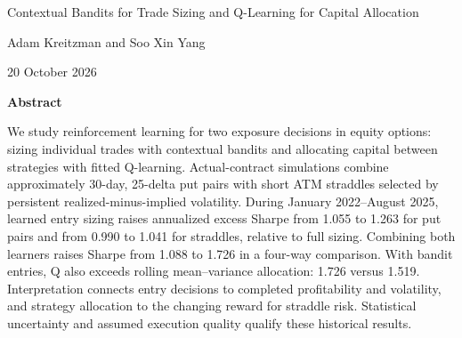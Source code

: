 \documentclass[11pt,letterpaper]{article}
\begin{document}
\begin{center}
\vspace{0.6em}

{\fontsize{11}{14}\selectfont Contextual Bandits for Trade Sizing and Q-Learning for Capital Allocation}\par
\vspace{1em}
Adam Kreitzman and Soo Xin Yang\par
{\small 20 October 2026}
\end{center}
\begin{center}
\begin{minipage}{0.88\textwidth}
\small
\begin{center}\bfseries Abstract\end{center}
\setlength{\parindent}{0pt}\noindent
We study reinforcement learning for two exposure decisions in equity options: sizing individual trades with contextual bandits and allocating capital between strategies with fitted Q-learning. Actual-contract simulations combine approximately 30-day, 25-delta put pairs with short ATM straddles selected by persistent realized-minus-implied volatility. During January 2022--August 2025, learned entry sizing raises annualized excess Sharpe from 1.055 to 1.263 for put pairs and from 0.990 to 1.041 for straddles, relative to full sizing. Combining both learners raises Sharpe from 1.088 to 1.726 in a four-way comparison. With bandit entries, Q also exceeds rolling mean--variance allocation: 1.726 versus 1.519. Interpretation connects entry decisions to completed profitability and volatility, and strategy allocation to the changing reward for straddle risk. Statistical uncertainty and assumed execution quality qualify these historical results.
\end{minipage}
\end{center}




















\end{document}
